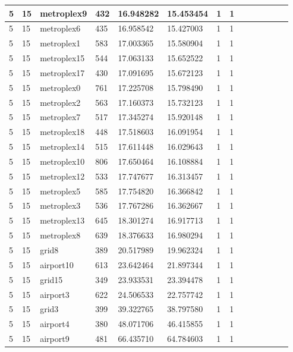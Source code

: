 \documentclass[../thesis.tex]{subfiles}
\begin{document}
\begin{table}[!ht]
\begin{tabularx}{\textwidth}{|X|X|X|X|X|X|X|X|X|X|X|X|X|X|}
        5 & 15 & metroplex9 & 432 & 16.948282 & 15.453454 & 1 & 1 \\ \hline
        5 & 15 & metroplex6 & 435 & 16.958542 & 15.427003 & 1 & 1 \\ \hline
        5 & 15 & metroplex1 & 583 & 17.003365 & 15.580904 & 1 & 1 \\ \hline
        5 & 15 & metroplex15 & 544 & 17.063133 & 15.652522 & 1 & 1 \\ \hline
        5 & 15 & metroplex17 & 430 & 17.091695 & 15.672123 & 1 & 1 \\ \hline
        5 & 15 & metroplex0 & 761 & 17.225708 & 15.798490 & 1 & 1 \\ \hline
        5 & 15 & metroplex2 & 563 & 17.160373 & 15.732123 & 1 & 1 \\ \hline
        5 & 15 & metroplex7 & 517 & 17.345274 & 15.920148 & 1 & 1 \\ \hline
        5 & 15 & metroplex18 & 448 & 17.518603 & 16.091954 & 1 & 1 \\ \hline
        5 & 15 & metroplex14 & 515 & 17.611448 & 16.029643 & 1 & 1 \\ \hline
        5 & 15 & metroplex10 & 806 & 17.650464 & 16.108884 & 1 & 1 \\ \hline
        5 & 15 & metroplex12 & 533 & 17.747677 & 16.313457 & 1 & 1 \\ \hline
        5 & 15 & metroplex5 & 585 & 17.754820 & 16.366842 & 1 & 1 \\ \hline
        5 & 15 & metroplex3 & 536 & 17.767286 & 16.362667 & 1 & 1 \\ \hline
        5 & 15 & metroplex13 & 645 & 18.301274 & 16.917713 & 1 & 1 \\ \hline
        5 & 15 & metroplex8 & 639 & 18.376633 & 16.980294 & 1 & 1 \\ \hline
        5 & 15 & grid8 & 389 & 20.517989 & 19.962324 & 1 & 1 \\ \hline
        5 & 15 & airport10 & 613 & 23.642464 & 21.897344 & 1 & 1 \\ \hline
        5 & 15 & grid15 & 349 & 23.933531 & 23.394478 & 1 & 1 \\ \hline
        5 & 15 & airport3 & 622 & 24.506533 & 22.757742 & 1 & 1 \\ \hline
        5 & 15 & grid3 & 399 & 39.322765 & 38.797580 & 1 & 1 \\ \hline
        5 & 15 & airport4 & 380 & 48.071706 & 46.415855 & 1 & 1 \\ \hline
        5 & 15 & airport9 & 481 & 66.435710 & 64.784603 & 1 & 1 \\ \hline

\end{tabularx}
\end{table}
\end{document}
